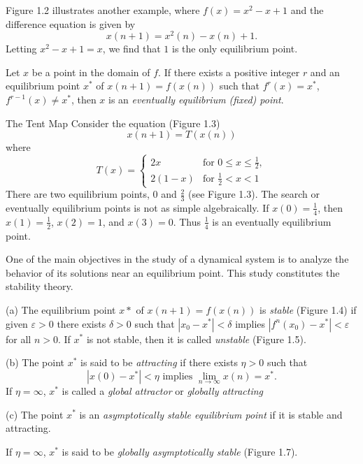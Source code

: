 Figure 1.2 illustrates another example, where $f(x)=x^2-x+1$ and the difference equation is given by
\[x(n+1)=x^2(n)-x(n)+1.\]
Letting $x^2-x+1=x$, we find that $1$ is the only equilibrium point.

\begin{definition}
    Let $x$ be a point in the domain of $f$. If there exists a positive integer $r$ and an equilibrium point $x^*$ of $x(n+1)=f(x(n))$ such that $f^r(x)=x^*$, $f^{r-1}(x)\neq x^*$, then $x$ is an \textit{eventually equilibrium (fixed) point}.
\end{definition}

\begin{eg}
    \item The Tent Map
        Consider the equation (Figure 1.3)
        \[x(n+1)=T(x(n))\]
        where
        \[
            T(x)=\begin{cases}
                2x & \text{for }0\leq x\leq\frac{1}{2}, \\
                2(1-x) & \text{for }\frac{1}{2}<x<1
            \end{cases}
        \]
        There are two equilibrium points, $0$ and $\frac{2}{3}$ (see Figure 1.3). The search or eventually equilibrium points is not as simple algebraically. If $x(0)=\frac{1}{4}$, then $x(1)=\frac{1}{2}$, $x(2)=1$, and $x(3)=0$. Thus $\frac{1}{4}$ is an eventually equilibrium point.
\end{eg}

One of the main objectives in the study of a dynamical system is to analyze the behavior of its solutions near an equilibrium point. This study constitutes the stability theory.

\begin{definition}
    (a) The equilibrium point $x*$ of $x(n+1)=f(x(n))$ is \textit{stable} (Figure 1.4) if given $\varepsilon>0$ there exists $\delta>0$ such that $|x_0-x^*|<\delta$ implies $|f^n(x_0)-x^*|<\varepsilon$ for all $n>0$. If $x^*$ is not stable, then it is called \textit{unstable} (Figure 1.5).

    (b) The point $x^*$ is said to be \textit{attracting} if there exists $\eta>0$ such that
    \[|x(0)-x^*|<\eta\text{ implies }\lim_{n\to\infty} x(n)=x^*.\]
    If $\eta=\infty$, $x^*$ is called a \textit{global attractor} or \textit{globally attracting}
    
    (c) The point $x^*$ is an \textit{asymptotically stable equilibrium point} if it is stable and attracting.

    If $\eta=\infty$, $x^*$ is said to be \textit{globally asymptotically stable} (Figure 1.7).
\end{definition}
